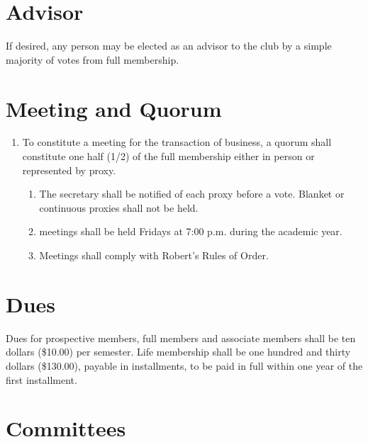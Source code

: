 \documentclass[
]{article}
\providecommand{\tightlist}{%
  \setlength{\itemsep}{0pt}\setlength{\parskip}{0pt}}
\begin{document}
\hypertarget{advisor}{%
\section{Advisor}\label{advisor}}

If desired, any person may be elected as an advisor to the club by a
simple majority of votes from full membership.

\hypertarget{meeting-and-quorum}{%
\section{Meeting and Quorum}\label{meeting-and-quorum}}

\begin{enumerate}
\def\labelenumi{\arabic{enumi}.}
\tightlist
\item
  To constitute a meeting for the transaction of business, a quorum
  shall constitute one half (1/2) of the full membership either in
  person or represented by proxy.

  \begin{enumerate}
  \def\labelenumii{\Alph{enumii}.}
  \tightlist
  \item
    The secretary shall be notified of each proxy before a vote. Blanket
    or continuous proxies shall not be held.
  \item
    meetings shall be held Fridays at 7:00 p.m. during the academic
    year.
  \item
    Meetings shall comply with Robert's Rules of Order.
  \end{enumerate}
\end{enumerate}

\hypertarget{dues}{%
\section{Dues}\label{dues}}

Dues for prospective members, full members and associate members shall
be ten dollars (\$10.00) per semester. Life membership shall be one
hundred and thirty dollars (\$130.00), payable in installments, to be
paid in full within one year of the first installment.

\hypertarget{committees}{%
\section{Committees}\label{committees}}
\end{document}
